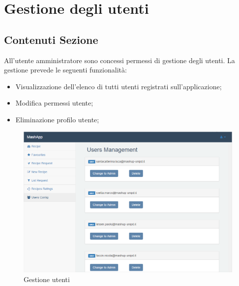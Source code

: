 %

\section{Gestione degli utenti} %
\label{sec:gestione_utenti}
	

	\subsection{Contenuti Sezione} %
	\label{sub:contenuti_sezione}
		All'utente amministratore sono concessi permessi di gestione degli utenti.
		La gestione prevede le seguenti funzionalità:
		\begin{itemize}
			\item Visualizzazione dell'elenco di tutti utenti registrati sull'applicazione;
			\item Modifica permessi utente;
			\item Eliminazione profilo utente;
		\end{itemize}
		\begin{figure}[H]
			\centering
			\centerline{\includegraphics[width=14cm]{images/configurazione_utenti.png}}
			\caption{Gestione utenti}
			\label{fig:configurazione_utenti}
		\end{figure}

